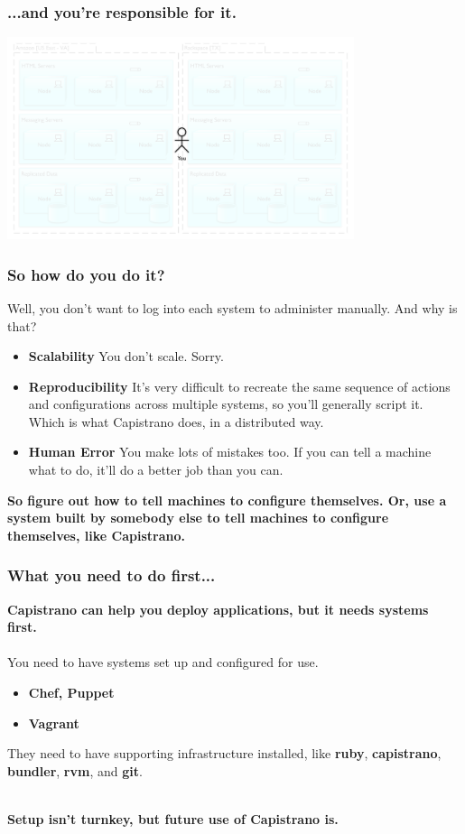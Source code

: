 \documentclass[t,handout]{beamer}
\begin{document}
\begin{frame}
\frametitle{...and you're responsible for it.}
\begin{center}
\includegraphics[width = 4in]{cap-distributed-you.pdf}
\end{center}
\transfade
\end{frame}

\begin{frame}
\frametitle{So how do you do it?}
Well, you don't want to log into each system to administer manually.  And why is that?
\begin{small}
\begin{itemize}
\item {\bf Scalability} You don't scale.  Sorry.
\item {\bf Reproducibility}  It's very difficult to recreate the same sequence of actions and configurations across multiple systems, so you'll generally script it.  Which is what Capistrano does, in a distributed way.
\item {\bf Human Error} You make lots of mistakes too.  If you can tell a machine what to do, it'll do a better job than you can.
\end{itemize}
\end{small}
\begin{center}
{\bf So figure out how to tell machines to configure themselves.  Or, use a system built by somebody else to tell machines to configure themselves, like Capistrano.}
\end{center}
\end{frame}

\begin{frame}
\frametitle{What you need to do first...}
{\bf Capistrano can help you deploy applications, but it needs systems first.} \\~\\
You need to have systems set up and configured for use.
\begin{small}
\begin{itemize}
\item {\bf Chef, Puppet}
\item {\bf Vagrant}
\end{itemize}
\end{small}
They need to have supporting infrastructure installed, like {\bf ruby}, {\bf capistrano}, {\bf bundler}, {\bf rvm}, and {\bf git}.\\~\\
\begin{center}
{\bf Setup isn't turnkey, but future use of Capistrano is.}
\end{center}
\end{frame}
\end{document}
